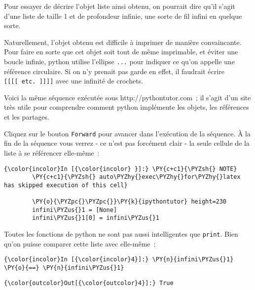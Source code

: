     Pour essayer de décrire l'objet liste ainsi obtenu, on pourrait dire
qu'il s'agit d'une liste de taille 1 et de profondeur infinie, une sorte
de fil infini en quelque sorte.

Naturellement, l'objet obtenu est difficile à imprimer de manière
convaincante. Pour faire en sorte que cet objet soit tout de même
imprimable, et éviter une boucle infinie, python utilise l'ellipse
\texttt{...} pour indiquer ce qu'on appelle une référence circulaire. Si
on n'y prenait pas garde en effet, il faudrait écrire
\texttt{{[}{[}{[}{[}\ etc.\ {]}{]}{]}{]}} avec une infinité de crochets.

    Voici la même séquence exécutée sous http://pythontutor.com~; il s'agit
d'un site très utile pour comprendre comment python implémente les
objets, les références et les partages.

Cliquez sur le bouton \texttt{Forward} pour avancer dans l'exécution de
la séquence. À la fin de la séquence vous verrez - ce n'est pas
forcément clair - la seule cellule de la liste à se référencer
elle-même~:

    \begin{Verbatim}[commandchars=\\\{\},frame=single,framerule=0.3mm,rulecolor=\color{cellframecolor}]
{\color{incolor}In [{\color{incolor} }]:} \PY{c+c1}{\PYZsh{} NOTE}
        \PY{c+c1}{\PYZsh{} auto\PYZhy{}exec\PYZhy{}for\PYZhy{}latex has skipped execution of this cell}
        
        \PY{o}{\PYZpc{}\PYZpc{}}\PY{k}{ipythontutor} height=230
        infini\PYZus{}1 = [None]
        infini\PYZus{}1[0] = infini\PYZus{}1
\end{Verbatim}


    Toutes les fonctions de python ne sont pas aussi intelligentes que
\texttt{print}. Bien qu'on puisse comparer cette liste avec elle-même~:

    \begin{Verbatim}[commandchars=\\\{\},frame=single,framerule=0.3mm,rulecolor=\color{cellframecolor}]
{\color{incolor}In [{\color{incolor}4}]:} \PY{n}{infini\PYZus{}1} \PY{o}{==} \PY{n}{infini\PYZus{}1}
\end{Verbatim}


\begin{Verbatim}[commandchars=\\\{\},frame=single,framerule=0.3mm,rulecolor=\color{cellframecolor}]
{\color{outcolor}Out[{\color{outcolor}4}]:} True
\end{Verbatim}
            
